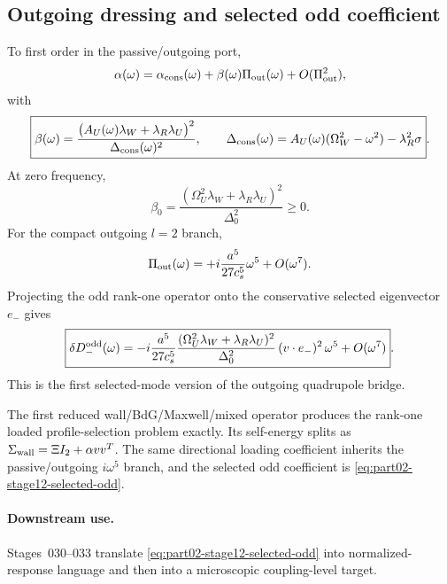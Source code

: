 \subsection{Outgoing dressing and selected odd coefficient}
\label{subsec:part02-stage029-odd-coefficient}

To first order in the passive/outgoing port,
\begin{equation}
\alpha(\omega)=\alpha_{\rm cons}(\omega)+\beta(\omega)\Pi_{\rm out}(\omega)+O(\Pi_{\rm out}^2),
\end{equation}
with
\begin{equation}
\label{eq:part02-stage12-beta}
\boxed{
\beta(\omega)=
\frac{\bigl(A_U(\omega)\lambda_W+\lambda_R\lambda_U\bigr)^2}
{\Delta_{\rm cons}(\omega)^2},
\qquad
\Delta_{\rm cons}(\omega)=A_U(\omega)(\Omega_W^2-\omega^2)-\lambda_R^2\sigma}.
\end{equation}
At zero frequency,
\begin{equation}
\label{eq:part02-stage12-beta0}
\boxed{
\beta_0=\frac{(\Omega_U^2\lambda_W+\lambda_R\lambda_U)^2}{\Delta_0^2}\geq0}.
\end{equation}
For the compact outgoing \(l=2\) branch,
\begin{equation}
\Pi_{\rm out}(\omega)=+i\frac{a^5}{27c_s^5}\omega^5+O(\omega^7).
\end{equation}
Projecting the odd rank-one operator onto the conservative selected eigenvector \(e_-\) gives
\begin{equation}
\label{eq:part02-stage12-selected-odd}
\boxed{
\delta D_-^{\rm odd}(\omega)
=
-i\frac{a^5}{27c_s^5}
\frac{(\Omega_U^2\lambda_W+\lambda_R\lambda_U)^2}{\Delta_0^2}
\,(v\cdot e_-)^2\,\omega^5
+O(\omega^7)}.
\end{equation}
This is the first selected-mode version of the outgoing quadrupole bridge.

\begin{theorem}
\label{thm:part02-loaded-dynamic-theorem}
The first reduced wall/BdG/Maxwell/mixed operator produces the rank-one loaded profile-selection problem exactly.  Its self-energy splits as \(\Sigma_{\rm wall}=\Xi I_2+\alpha vv^T\).  The same directional loading coefficient inherits the passive/outgoing \(i\omega^5\) branch, and the selected odd coefficient is \eqref{eq:part02-stage12-selected-odd}.
\end{theorem}

\paragraph{Downstream use.}
Stages~030--033 translate \eqref{eq:part02-stage12-selected-odd} into normalized-response language and then into a microscopic coupling-level target.

